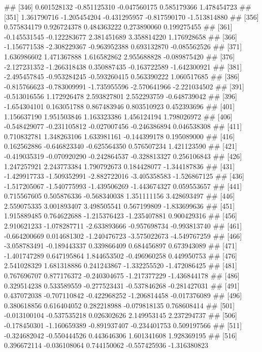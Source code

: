 \documentclass[
]{article}
\begin{document}
\begin{enumerate}[label=(\alph*)]
##  [346]  0.601528132 -0.851125310 -0.047560175  0.585179366  1.478454723
##  [351]  1.361790716 -1.205454204 -0.431295957 -0.817590170 -1.513814880
##  [356]  0.575834179  0.926724378  0.484363222  0.273890060  0.199275455
##  [361] -0.145531545 -0.122283677  2.381451689  3.358814220  1.176928658
##  [366] -1.156771538 -2.308229367 -0.963952388  0.693132870 -0.085562526
##  [371]  1.636986602  1.471367888  1.616582862  2.955688828 -0.089875420
##  [376] -2.127231352 -1.266318438  0.350887435 -0.163722589 -1.642300921
##  [381] -2.495457845 -0.953284245 -0.593260415  0.563390222  1.060517685
##  [386] -0.815766623 -0.783009991 -1.735955596 -2.570641966 -2.221034502
##  [391] -0.513016556  1.172926478  2.593827801  2.552293759 -0.648739042
##  [396] -1.654304101  0.163051788  0.867483946  0.803510923  0.452393696
##  [401]  1.156637190  1.951503846  1.163323386  1.456124194  1.798026972
##  [406] -0.548429077 -0.231105812 -0.027007456 -0.246386894  0.046538308
##  [411]  0.710832781  1.348263106  1.633981161 -0.144399178  0.195089000
##  [416]  0.162562886 -0.646823340 -0.625564350  0.576507234  1.421123590
##  [421] -0.419035319 -0.070920290 -0.242864537 -0.328813327  0.256106843
##  [426]  1.247257921  2.243773384  1.790792673  0.184428077 -1.344187836
##  [431] -1.429917733 -1.509352991 -2.882722016 -3.405358583 -1.526867125
##  [436] -1.517205067 -1.540775993 -1.439506269 -1.443674327  0.059553657
##  [441]  0.715567605  0.505876336 -0.568340038  1.351111156  3.428693497
##  [446]  2.559075335  3.001893407  3.498505541  0.567199809 -1.833699636
##  [451]  1.915889485  0.764622688 -1.215376423 -1.235407881  0.900429316
##  [456]  2.910621233 -1.078287711 -2.633893666 -0.957698734 -0.993813740
##  [461] -0.664200669  0.014681302 -1.240476723 -3.575022673 -4.549767259
##  [466] -3.058783491 -0.189443337  0.339866409  0.684456897  0.673943089
##  [471] -1.401747289  0.647195864  1.844653502 -0.496960258  0.449950753
##  [476]  2.541028329  1.681318886  0.241243867 -1.332255520 -1.472086425
##  [481]  0.767696707  0.877176372 -0.240304675 -1.217377229 -1.436844178
##  [486]  0.329514238  0.533589559 -0.277523431 -0.537846268 -0.281427031
##  [491]  0.437072038 -0.707110842 -0.422968252 -1.206814458 -0.017376089
##  [496]  0.380618856  0.616404052  0.282218988 -0.079818135  0.768608414
##  [501] -0.013100104 -0.537535218  0.026302626  2.149953145  2.237294737
##  [506] -0.178450301 -1.160659389 -0.891937407 -0.234401753  0.509197566
##  [511] -0.324682042 -0.550444526  0.443646306  1.601341608  1.928369195
##  [516]  0.396672114 -0.036108064  0.744150062 -0.557425936 -1.316380823

\end{enumerate}
\end{document}
